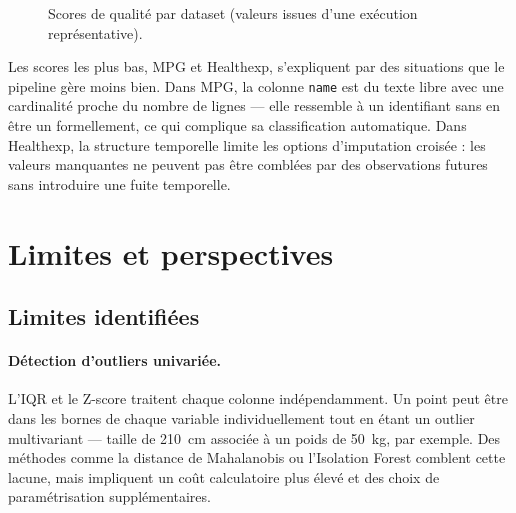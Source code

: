 \documentclass[12pt,a4paper]{article}
\begin{document}
\begin{figure}[H]
\centering
{}
\caption{Scores de qualité par dataset (valeurs issues d'une exécution représentative).}
\label{fig:scores}
\end{figure}

Les scores les plus bas, MPG et Healthexp, s'expliquent par des situations que le pipeline
gère moins bien. Dans MPG, la colonne \texttt{name} est du texte libre avec une cardinalité
proche du nombre de lignes --- elle ressemble à un identifiant sans en être un formellement,
ce qui complique sa classification automatique. Dans Healthexp, la structure temporelle
limite les options d'imputation croisée : les valeurs manquantes ne peuvent pas être
comblées par des observations futures sans introduire une fuite temporelle.

\section{Limites et perspectives}

\subsection{Limites identifiées}

\paragraph{Détection d'outliers univariée.}
L'IQR et le Z-score traitent chaque colonne indépendamment. Un point peut être dans les
bornes de chaque variable individuellement tout en étant un outlier multivariant ---
taille de 210~cm associée à un poids de 50~kg, par exemple. Des méthodes comme la
distance de Mahalanobis ou l'Isolation Forest comblent cette lacune, mais impliquent un
coût calculatoire plus élevé et des choix de paramétrisation supplémentaires.
\end{document}
